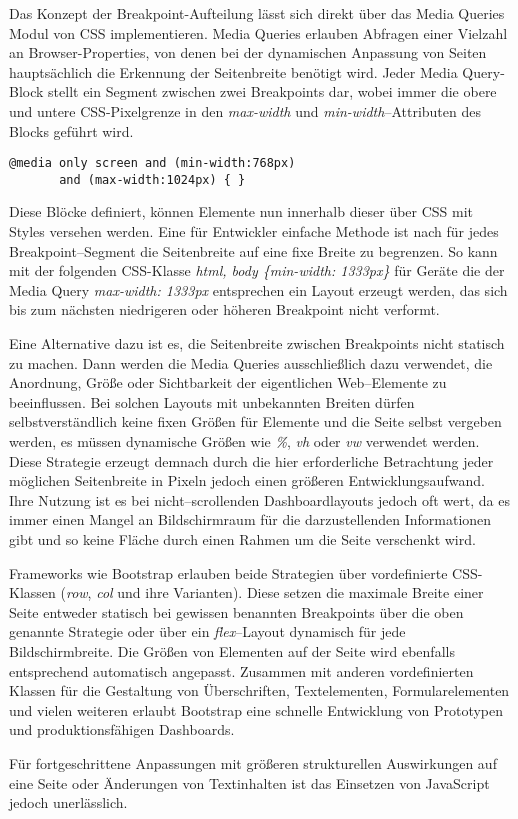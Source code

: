 Das Konzept der Breakpoint-Aufteilung lässt sich direkt über das Media Queries Modul von CSS implementieren.
\autocite{JiangResponsiveWebDesignModeAndApplication.2014}
Media Queries erlauben Abfragen einer Vielzahl an Browser-Properties, von denen bei der dynamischen Anpassung von Seiten hauptsächlich die Erkennung der Seitenbreite benötigt wird.
Jeder Media Query-Block stellt ein Segment zwischen zwei Breakpoints dar, wobei immer die obere und untere CSS-Pixelgrenze in den \emph{max-width} und \emph{min-width}--Attributen des Blocks geführt wird.

\begin{verbatim}
@media only screen and (min-width:768px)
       and (max-width:1024px) { }
\end{verbatim}

Diese Blöcke definiert, können Elemente nun innerhalb dieser über CSS mit Styles versehen werden.
Eine für Entwickler einfache Methode ist nach \autocite{JiangResponsiveWebDesignModeAndApplication.2014} für jedes Breakpoint--Segment die Seitenbreite auf eine fixe Breite zu begrenzen.
So kann mit der folgenden CSS-Klasse \emph{html, body \{min-width: 1333px\}} für Geräte die der Media Query \emph{max-width: 1333px} entsprechen ein Layout erzeugt werden, das sich bis zum nächsten niedrigeren oder höheren Breakpoint nicht verformt.

Eine Alternative dazu ist es, die Seitenbreite zwischen Breakpoints nicht statisch zu machen.
Dann werden die Media Queries ausschließlich dazu verwendet, die Anordnung, Größe oder Sichtbarkeit der eigentlichen Web--Elemente zu beeinflussen.
\autocite[S. 33]{Laati.ImplementingResponsiveDesignInIndustrialDashboardEditor.2017} Bei solchen Layouts mit unbekannten Breiten dürfen selbstverständlich keine fixen Größen für Elemente und die Seite selbst vergeben werden, es müssen dynamische Größen wie \emph{\%}, \emph{vh} oder \emph{vw} verwendet werden.
Diese Strategie erzeugt demnach durch die hier erforderliche Betrachtung jeder möglichen Seitenbreite in Pixeln jedoch einen größeren Entwicklungsaufwand.
Ihre Nutzung ist es bei nicht--scrollenden Dashboardlayouts jedoch oft wert, da es immer einen Mangel an Bildschirmraum für die darzustellenden Informationen gibt und so keine Fläche durch einen Rahmen um die Seite verschenkt wird.

Frameworks wie Bootstrap erlauben beide Strategien über vordefinierte CSS-Klassen (\emph{row}, \emph{col} und ihre Varianten).
Diese setzen die maximale Breite einer Seite entweder statisch bei gewissen benannten Breakpoints über die oben genannte Strategie oder über ein \emph{flex}--Layout dynamisch für jede Bildschirmbreite.
Die Größen von Elementen auf der Seite wird ebenfalls entsprechend automatisch angepasst.
Zusammen mit anderen vordefinierten Klassen für die Gestaltung von Überschriften, Textelementen, Formularelementen und vielen weiteren erlaubt Bootstrap eine schnelle Entwicklung von Prototypen und produktionsfähigen Dashboards.

\autocite[S. 72]{Harmsen.2018} Für fortgeschrittene Anpassungen mit größeren strukturellen Auswirkungen auf eine Seite oder Änderungen von Textinhalten ist das Einsetzen von JavaScript jedoch unerlässlich.
